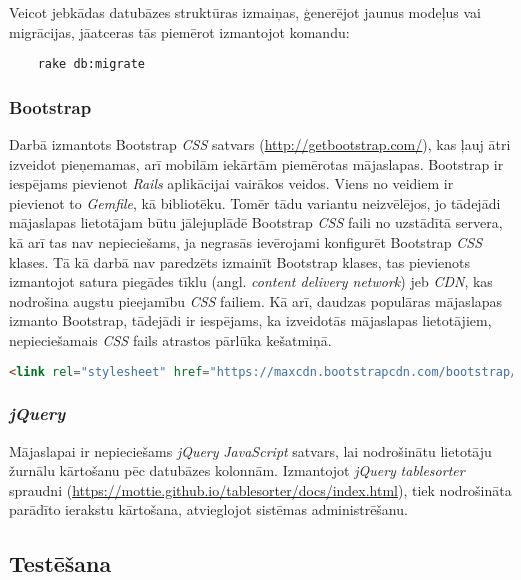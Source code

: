 Veicot jebkādas datubāzes struktūras izmaiņas, ģenerējot jaunus modeļus vai migrācijas, jāatceras tās piemērot izmantojot komandu:
\begin{lstlisting}
	rake db:migrate
\end{lstlisting}

\subsubsection{Bootstrap}
Darbā izmantots Bootstrap \textit{CSS}  satvars (\url{http://getbootstrap.com/}), kas ļauj ātri izveidot pieņemamas, arī mobilām iekārtām piemērotas mājaslapas.
Bootstrap ir iespējams pievienot \textit{Rails} aplikācijai vairākos veidos. Viens no veidiem ir pievienot to \textit{Gemfile}, kā bibliotēku. Tomēr tādu variantu neizvēlējos, jo tādejādi mājaslapas lietotājam būtu jālejuplādē Bootstrap \textit{CSS}  faili no uzstādītā servera, kā arī tas nav nepieciešams, ja negrasās ievērojami konfigurēt Bootstrap \textit{CSS}  klases.
Tā kā darbā nav paredzēts izmainīt Bootstrap klases, tas pievienots izmantojot satura piegādes tīklu (angl. \textit{content delivery network}) jeb \textit{CDN}, kas nodrošina augstu pieejamību \textit{CSS}  failiem. Kā arī, daudzas populāras mājaslapas izmanto Bootstrap, tādejādi ir iespējams, ka izveidotās mājaslapas lietotājiem, nepieciešamais \textit{CSS}  fails atrastos pārlūka kešatmiņā.
\begin{lstlisting}[language=HTML]
<link rel="stylesheet" href="https://maxcdn.bootstrapcdn.com/bootstrap/3.3.6/css/bootstrap.min.css" integrity="sha384-1q8mTJOASx8j1Au+a5WDVnPi2lkFfwwEAa8hDDdjZlpLegxhjVME1fgjWPGmkzs7" crossorigin="anonymous">
\end{lstlisting}

\subsubsection{\textit{jQuery}}
Mājaslapai ir nepieciešams \textit{jQuery} \textit{JavaScript}  satvars, lai nodrošinātu lietotāju žurnālu kārtošanu pēc datubāzes kolonnām. Izmantojot \textit{jQuery} \textit{tablesorter} spraudni (\url{https://mottie.github.io/tablesorter/docs/index.html}), tiek nodrošināta parādīto ierakstu kārtošana, atvieglojot sistēmas administrēšanu.

\subsection{Testēšana} \label{Testing}


